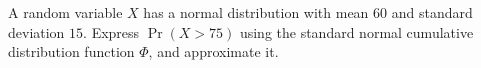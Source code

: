 A random variable $X$ has a normal distribution with mean $60$ and standard deviation $15$. Express $\Pr(X>75)$ using the standard normal cumulative distribution function $\Phi$, and approximate it.
